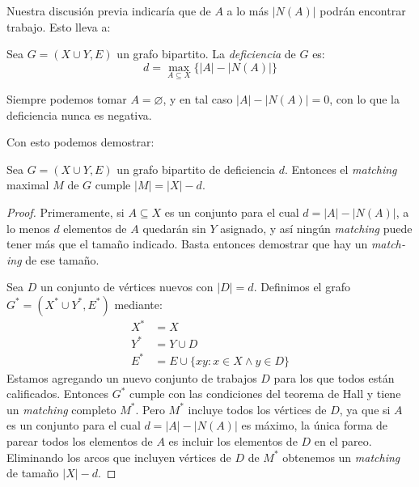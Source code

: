   Nuestra discusión previa
  indicaría que de \(A\)
  a lo más \(\lvert N(A) \rvert\) podrán encontrar trabajo.
  Esto lleva a:
  \begin{definition}
    Sea \(G = (X \cup Y, E)\) un grafo bipartito.
    La \emph{deficiencia} de \(G\) es:%
    \begin{equation*}
      d = \max_{A \subseteq X} \{\lvert A \rvert - \lvert N(A) \rvert\}
    \end{equation*}
  \end{definition}
  Siempre podemos tomar \(A = \varnothing\),
  y en tal caso \(\lvert A \rvert - \lvert N(A) \rvert = 0\),
  con lo que la deficiencia nunca es negativa.

  Con esto podemos demostrar:
  \begin{theorem}
    \label{theo:maximal-matching}
    Sea \(G = (X \cup Y, E)\)
    un grafo bipartito de deficiencia \(d\).
    Entonces
    el \emph{\foreignlanguage{english}{matching}} maximal \(M\)
    de \(G\)
    cumple \(\lvert M \rvert = \lvert X \rvert - d\).
  \end{theorem}
  \begin{proof}
    Primeramente,
    si \(A \subseteq X\) es un conjunto
    para el cual \(d = \lvert A \rvert - \lvert N(A) \rvert\),
    a lo menos \(d\) elementos de \(A\) quedarán sin \(Y\) asignado,
    y así ningún \emph{\foreignlanguage{english}{matching}}
    puede tener más que el tamaño indicado.
    Basta entonces demostrar
    que hay un \emph{\foreignlanguage{english}{matching}}
    de ese tamaño.

    Sea \(D\) un conjunto de vértices nuevos
    con \(\lvert D \rvert = d\).
    Definimos el grafo \(G^{*} = (X^{*} \cup Y^{*}, E^{*})\)
    mediante:
    \begin{align*}
      X^{*} &= X \\
      Y^{*} &= Y \cup D \\
      E^{*} &= E \cup \{ x y : x \in X \wedge y \in D \}
    \end{align*}
    Estamos agregando un nuevo conjunto de trabajos \(D\)
    para los que todos están calificados.
    Entonces \(G^{*}\)
    cumple con las condiciones del teorema de Hall
    y tiene
    un \emph{\foreignlanguage{english}{matching}} completo
    \(M^{*}\).
    Pero \(M^{*}\) incluye todos los vértices de \(D\),
    ya que si \(A\) es un conjunto
    para el cual \(d = \lvert A \rvert - \lvert N(A) \rvert\)
    es máximo,
    la única forma de parear todos los elementos de \(A\)
    es incluir los elementos de \(D\) en el pareo.
    Eliminando los arcos que incluyen vértices de \(D\) de \(M^{*}\)
    obtenemos un \emph{\foreignlanguage{english}{matching}}
    de tamaño \(\lvert X \rvert - d\).
  \end{proof}

